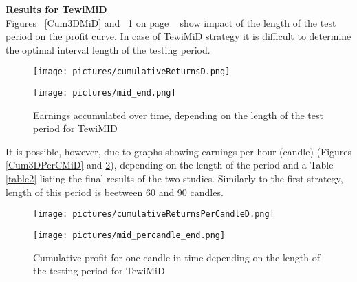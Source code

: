 \documentclass{tewiart}
\begin{document}

\textbf{Results for TewiMiD }\\
Figures ~\ref{Cum3DMiD} and ~\ref{Cum3DMiDend} on page ~\pageref{Cum3DMiDend} show impact of the length of the test period on the profit curve. In case of TewiMiD strategy it is difficult to determine the optimal interval length of the testing period.

\begin{figure}[h!]
\begin{minipage}{.459\linewidth}
\begin{center}
\texttt{[image: pictures/cumulativeReturnsD.png]}
\label{Cum3DMiD}
\end{center}
\end{minipage}
\begin{minipage}{.49\linewidth}
\begin{center}
\texttt{[image: pictures/mid\_end.png]}
\label{Cum3DMiDend}
\end{center}
\end{minipage}
\caption{Earnings accumulated over time, depending on the length of the test period for TewiMID}
\end{figure}
\FloatBarrier

It is possible, however, due to graphs showing earnings per hour (candle) (Figures \ref{Cum3DPerCMiD} and \ref{Cum3DPerCMiDend}), depending on the length of the period and a Table \ref{table2} listing the final results of the two studies. Similarly to the first strategy, length of this period is beetween 60  and 90 candles.

\begin{figure}[h!]
\centering
\begin{minipage}{.49\linewidth}
\begin{center}
\texttt{[image: pictures/cumulativeReturnsPerCandleD.png]}
\label{Cum3DPerCMiD}
\end{center}
\end{minipage}
\begin{minipage}{.49\linewidth}
\begin{center}
\texttt{[image: pictures/mid\_percandle\_end.png]}
\label{Cum3DPerCMiDend}
\end{center}
\end{minipage}
\caption{Cumulative profit for one candle in time depending on the length of the testing period for TewiMiD}
\end{figure}
\FloatBarrier
\end{document}
